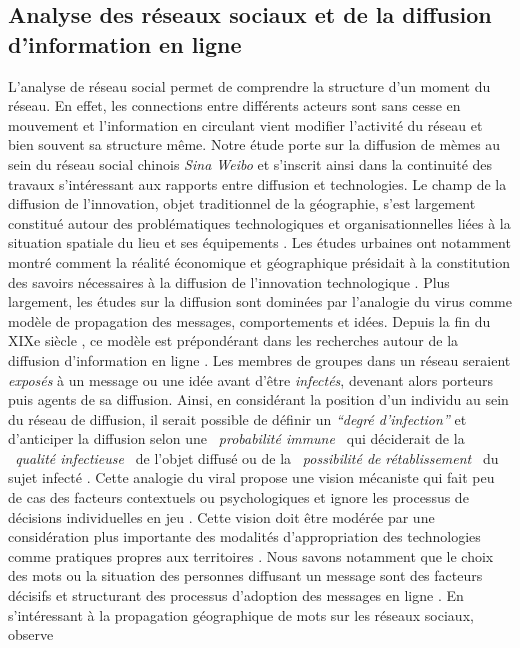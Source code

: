 \subsection[Analyse de réseaux sociaux et de la diffusion d'information en ligne]{Analyse des réseaux sociaux et de la diffusion d'information en ligne}

L{\textquoteright}analyse de réseau social permet de comprendre la structure d{\textquoteright}un moment du réseau. En effet, les connections entre différents acteurs sont sans cesse en mouvement et l{\textquoteright}information en circulant vient modifier l{\textquoteright}activité du réseau et bien souvent sa structure m\^eme. Notre étude porte sur la diffusion de mèmes au sein du réseau social chinois \textit{Sina Weibo} et s{\textquoteright}inscrit ainsi dans la continuité des travaux s{\textquoteright}intéressant aux rapports entre diffusion et technologies. Le champ de la diffusion de l{\textquoteright}innovation, objet traditionnel de la géographie, s{\textquoteright}est largement constitué autour des problématiques technologiques et organisationnelles liées à la situation spatiale du lieu et ses équipements \citep{Crevoisier2004}. Les études urbaines ont notamment montré comment la réalité économique et géographique présidait à la constitution des savoirs nécessaires à la diffusion de l{\textquoteright}innovation technologique \citep{Howells2002}. Plus largement, les études sur la diffusion sont dominées par l{\textquoteright}analogie du virus comme modèle de propagation des messages, comportements et idées. Depuis la fin du XIXe siècle \citep{LeBon1895}, ce modèle est prépondérant dans les recherches autour de la diffusion d{\textquoteright}information en ligne \citep{Goel2012}. Les membres de groupes dans un réseau seraient \textit{exposés }à un message ou une idée avant d{\textquoteright}\^etre \textit{infectés}, devenant alors porteurs puis agents de sa diffusion. Ainsi, en considérant la position d{\textquoteright}un individu au sein du réseau de diffusion, il serait possible de définir un \textit{{\textquotedblleft}}\textit{degré d{\textquoteright}infection{\textquotedblright}} \citep{Cheng2013} et d{\textquoteright}anticiper la diffusion selon une \textit{{\guillemotleft}~probabilité immune~{\guillemotright} }qui\textit{ }déciderait de la \textit{{\guillemotleft}~qualité infectieuse~{\guillemotright} }de l{\textquoteright}objet diffusé ou de la \textit{{\guillemotleft}~possibilité de }\textit{rétablissement~{\guillemotright} }du sujet infecté \citep{Wang2011}. Cette analogie du viral propose une vision mécaniste qui fait peu de cas des facteurs contextuels ou psychologiques et ignore les processus de décisions individuelles en jeu \citep{Jackson2010}. Cette vision doit \^etre modérée par une considération plus importante des modalités d{\textquoteright}appropriation des technologies comme pratiques propres aux territoires \citep{Fernandez2010}. Nous savons notamment que le choix des mots ou la situation des personnes diffusant un message sont des facteurs décisifs et structurant des processus d{\textquoteright}adoption des messages en ligne \citep{Conover2013}.  En s{\textquoteright}intéressant à la propagation géographique de mots sur les réseaux sociaux, \cite{Eisenstein2012} observe 